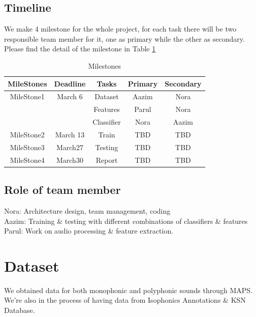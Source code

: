 \documentclass{article}
\begin{document}
\subsection{Timeline}\label{subsec:Timeline}
We make 4 milestone for the whole project, for each task there will be two responsible team member for it, one as primary while the other as secondary. Please find the detail of the milestone in Table \ref{table1}
\begin{table}[h]
 \begin{center}
\begin{tabular}{c|c|c|c|c}
        \toprule
         MileStones & Deadline & Tasks & Primary & Secondary  \\
       \midrule
        MileStone1 & March 6 & Dataset & Aazim & Nora \\
         &  & Features   & Parul & Nora \\
         &  & Classifier  & Nora & Aazim \\
        \midrule
        MileStone2 & March 13 & Train & TBD  &  TBD    \\
        \midrule
        MileStone3 & March27 & Testing & TBD &  TBD   \\
                \midrule
        MileStone4 & March30 & Report &TBD  & TBD    \\
        \bottomrule
\end{tabular}
\end{center}
 \caption{Milestones}
 \label{table1}
\end{table}


\subsection{Role of team member}\label{subsec:Role of team member}
Nora: Architecture design, team management, coding\\
Aazim: Training \& testing with different combinations of classifiers \& features\\
Parul: Work on audio processing \& feature extraction. 
 
%
\section{Dataset}\label{sec:Dataset}
We obtained data for both monophonic and polyphonic sounds through MAPS. We're also in the process of having data from Isophonics Annotations \& KSN Database. 
\end{document}
